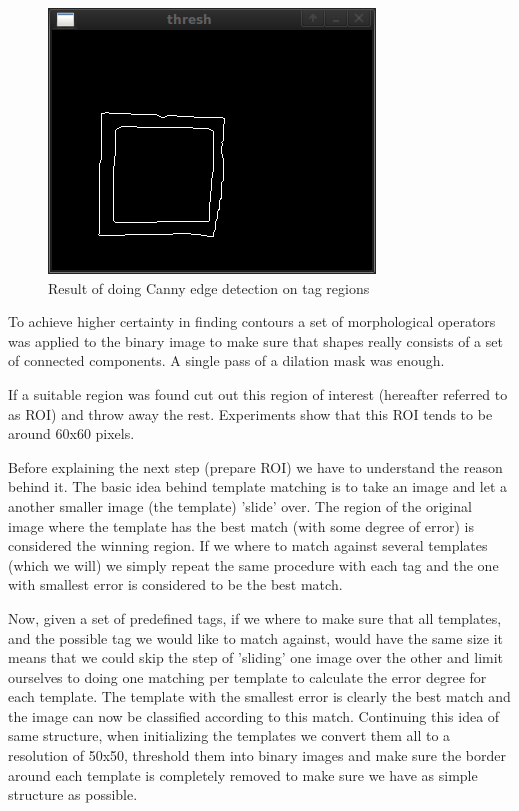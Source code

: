 \begin{figure}[h]
\label{fig:canny_edge}
    \begin{centering}
   	 \includegraphics[scale=1.0]{figures/canny.png}
   	 \caption{Result of doing Canny edge detection on tag regions}\label{fig:canny_edge}
    \end{centering}
\end{figure}

To achieve higher certainty in finding contours a set of morphological operators was applied to the binary image to make sure that shapes really consists of a set of connected components. A single pass of a dilation mask was enough.

If a suitable region was found cut out this region of interest (hereafter referred to as ROI) and throw away the rest. Experiments show that this ROI tends to be around 60x60 pixels. 

Before explaining the next step (prepare ROI) we have to understand the reason behind it. The basic idea behind template matching is to take an image and let a another smaller image (the template) 'slide' over. The region of the original image where the template has the best match (with some degree of error) is considered the winning region. If we where to match against several templates (which we will) we simply repeat the same procedure with each tag and the one with smallest error is considered to be the best match.

Now, given a set of predefined tags, if we where to make sure that all templates, and the possible tag we would like to match against, would have the same size it means that we could skip the step of 'sliding' one image over the other and limit ourselves to doing one matching per template to calculate the error degree for each template. The template with the smallest error is clearly the best match and the image can now be classified according to this match. Continuing this idea of same structure, when initializing the templates we convert them all to a resolution of 50x50, threshold them into binary images and make sure the border around each template is completely removed to make sure we have as simple structure as possible.

